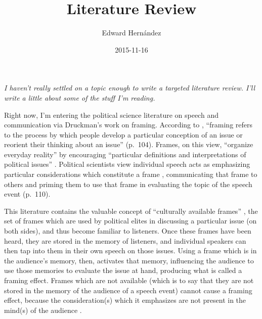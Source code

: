 \documentclass[man,12pt]{apa6}
\begin{document}
\title{Literature Review}
\author{Edward Hern\'{a}ndez}
\date{2015-11-16}
\maketitle

\noindent
\emph{
I haven't really settled on a topic enough to write a targeted literature
review. I'll write a little about some of the stuff I'm reading.
}

\vspace{12pt}

Right now, I'm entering the political science literature on speech and
communication via Druckman's work on framing. According to ,
``framing refers to the process by which people develop a particular conception
of an issue or reorient their thinking about an issue'' (p.~104). Frames, on
this view, ``organize everyday reality'' \cite[p.~193]{Tuchman78} by
encouraging ``particular definitions and interpretations of political issues''
\cite[p.~343]{Shah02}. Political scientists view individual speech acts as
emphasizing particular considerations which constitute a frame
\cite[p~106]{Chong07}, communicating that frame to others and priming them to
use that frame in evaluating the topic of the speech event (p.~110).

This literature contains the valuable concept of ``culturally available
frames'' \cite[p.~144]{Gamson87}, the set of frames which are used by political
elites in discussing a particular issue (on both sides), and thus become
familiar to listeners. Once these frames have been heard, they are stored in
the memory of listeners, and individual speakers can then tap into them in
their own speech on those issues.
%
%
Using a frame which is in the audience's memory, then, activates that memory,
influencing the audience to use those memories to evaluate the issue at hand,
producing what is called a framing effect. Frames which are not available
(which is to say that they are not stored in the memory of the audience of a
speech event) cannot cause a framing effect, because the consideration(s) which
it emphasizes are not present in the mind(s) of the audience
\cite[p.~110]{Chong07}.
\end{document}
